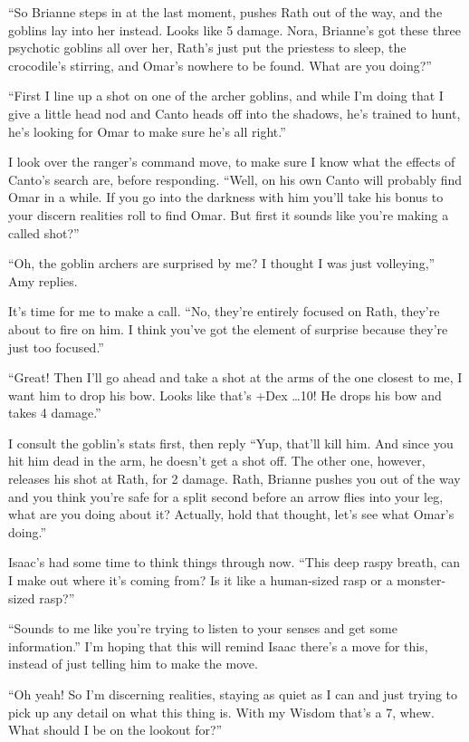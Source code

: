 ``So Brianne steps in at the last moment, pushes Rath out of the way, and the goblins lay into her instead. Looks like 5 damage. Nora, Brianne's got these three psychotic goblins all over her, Rath's just put the priestess to sleep, the crocodile's stirring, and Omar's nowhere to be found. What are you doing?''

``First I line up a shot on one of the archer goblins, and while I'm doing that I give a little head nod and Canto heads off into the shadows, he's trained to hunt, he's looking for Omar to make sure he's all right.''

I look over the ranger's command move, to make sure I know what the effects of Canto's search are, before responding. ``Well, on his own Canto will probably find Omar in a while. If you go into the darkness with him you'll take his bonus to your discern realities roll to find Omar. But first it sounds like you're making a called shot?''

``Oh, the goblin archers are surprised by me? I thought I was just volleying,'' Amy replies.

It's time for me to make a call. ``No, they're entirely focused on Rath, they're about to fire on him. I think you've got the element of surprise because they're just too focused.''

``Great! Then I'll go ahead and take a shot at the arms of the one closest to me, I want him to drop his bow. Looks like that's +Dex \ldots  10! He drops his bow and takes 4 damage.''

I consult the goblin's stats first, then reply ``Yup, that'll kill him. And since you hit him dead in the arm, he doesn't get a shot off. The other one, however, releases his shot at Rath, for 2 damage. Rath, Brianne pushes you out of the way and you think you're safe for a split second before an arrow flies into your leg, what are you doing about it? Actually, hold that thought, let's see what Omar's doing.''

Isaac's had some time to think things through now. ``This deep raspy breath, can I make out where it's coming from? Is it like a human-sized rasp or a monster-sized rasp?''

``Sounds to me like you're trying to listen to your senses and get some information.'' I'm hoping that this will remind Isaac there's a move for this, instead of just telling him to make the move.

``Oh yeah! So I'm discerning realities, staying as quiet as I can and just trying to pick up any detail on what this thing is. With my Wisdom that's a 7, whew. What should I be on the lookout for?''

